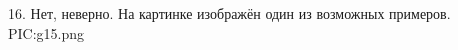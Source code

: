 16. Нет, неверно. На картинке изображён один из возможных примеров.
{{PIC:g15.png}}\newpage\noindent
